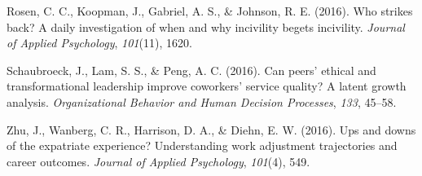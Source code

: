 \documentclass[english,,man]{apa6}
\theoremstyle{definition}
\theoremstyle{definition}
\theoremstyle{definition}
\theoremstyle{remark}
\begin{document}
\leavevmode\hypertarget{ref-rosen2016}{}%
Rosen, C. C., Koopman, J., Gabriel, A. S., \& Johnson, R. E. (2016). Who
strikes back? A daily investigation of when and why incivility begets
incivility. \emph{Journal of Applied Psychology}, \emph{101}(11), 1620.

\leavevmode\hypertarget{ref-schaubroeck2016}{}%
Schaubroeck, J., Lam, S. S., \& Peng, A. C. (2016). Can peers' ethical
and transformational leadership improve coworkers' service quality? A
latent growth analysis. \emph{Organizational Behavior and Human Decision
Processes}, \emph{133}, 45--58.

\leavevmode\hypertarget{ref-zhu2016}{}%
Zhu, J., Wanberg, C. R., Harrison, D. A., \& Diehn, E. W. (2016). Ups
and downs of the expatriate experience? Understanding work adjustment
trajectories and career outcomes. \emph{Journal of Applied Psychology},
\emph{101}(4), 549.
\end{document}
